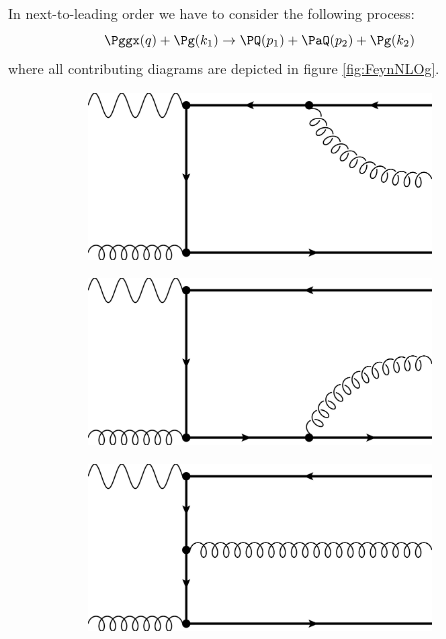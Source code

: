 \label{sec:NLO.g}
In next-to-leading order we have to consider the following process:
\begin{equation}
\Pggx(q) + \Pg(k_1) \rightarrow \PQ(p_1)+\PaQ(p_2) + \Pg(k_2)
\end{equation}
where all contributing diagrams are depicted in figure \ref{fig:FeynNLOg}.
\begin{figure}[ht!]
\centering
\begin{subfigure}[t]{.23\textwidth}
	\includegraphics[width=\textwidth]{pyfeyn/nlo-g-1}
	\caption{}
\end{subfigure}\hspace{.02\textwidth}%
\begin{subfigure}[t]{.23\textwidth}
	\includegraphics[width=\textwidth]{pyfeyn/nlo-g-2}
	\caption{}
\end{subfigure}\hspace{.02\textwidth}%
\begin{subfigure}[t]{.23\textwidth}
	\includegraphics[width=\textwidth]{pyfeyn/nlo-g-3}

\end{subfigure}
\end{figure}
